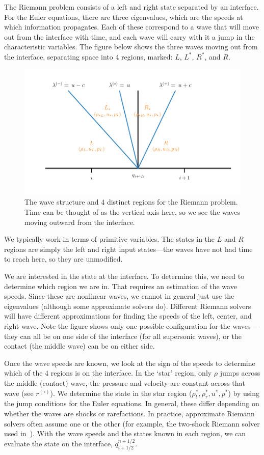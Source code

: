 \documentclass[11pt]{article}
\newcommand{\evz}{{(\circ)}}
\begin{document}
The Riemann problem consists of a left and right state separated by an
interface.  For the Euler equations, there are three eigenvalues, which
are the speeds at which information propagates.  Each of these
correspond to a wave that will move out from the interface with time,
and each wave will carry with it a jump in the characteristic variables.  The
figure below shows the three waves moving out from the interface,
separating space into 4 regions, marked: $L$, $L^*$, $R^*$, and $R$.
\begin{figure}[h]
\centering
\includegraphics[width=4.5in]{riemann-waves}
\caption{The wave structure and 4 distinct regions for the Riemann
  problem.  Time can be thought of as the vertical axis here, so we
  see the waves moving outward from the interface.}
\end{figure} 
We typically work in terms of primitive variables.  The states in the
$L$ and $R$ regions are simply the left and right input states---the
waves have not had time to reach here, so they are unmodified.

We are interested in the state at the interface.  To
determine this, we need to determine which region we are in.  That
requires an estimation of the wave speeds.  Since these are nonlinear
waves, we cannot in general just use the eigenvalues (although some
approximate solvers do).  Different Riemann solvers will have
different approximations for finding the speeds of the left, center,
and right wave.  Note the figure shows only one possible configuration
for the waves---they can all be on one side of the interface (for
all supersonic waves), or the contact (the middle wave) can be on either
side.

Once the wave speeds are known, we look at the sign of the speeds to
determine which of the 4 regions is on the interface.  In the `star'
region, only $\rho$ jumps across the middle (contact) wave, the
pressure and velocity are constant across that wave (see $r^\evz$).
We determine the state in the star region ($\rho_l^*, \rho_r^*, u^*,
p^*$) by using the jump conditions for the Euler equations.  In
general, these differ depending on whether the waves are shocks or
rarefactions.  In practice, approximate Riemann solvers often assume
one or the other (for example, the two-shock Riemann solver used
in~\cite{colellaglaz:1985}).  With the wave speeds and the states
known in each region, we can evaluate the state on the interface,
$q_{i+1/2}^{n+1/2}$.
\end{document}
